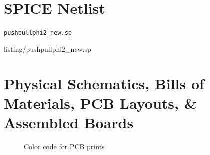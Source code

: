 \newpage
\onecolumn
\begin{appendices}
    \section{SPICE Netlist}
    
    \begin{verbbox}
        \footnotesize\verb|pushpullphi2_new.sp|
    \end{verbbox}
     {listing/pushpullphi2_new.sp}
    \centering
    \section{Physical Schematics, Bills of Materials, PCB Layouts, \& Assembled Boards}
    \label{sec:appendix:pcb}
    \begin{figure}[H]
        \centering
        
        \label{fig:pcb-color-map}
        \caption{Color code for PCB prints}
    \end{figure}
    \newpage

\end{appendices}
